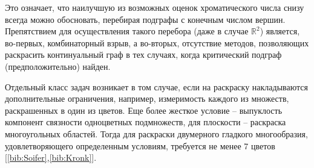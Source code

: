 Это означает, что наилучшую из возможных оценок хроматического числа снизу всегда можно обосновать, перебирая подграфы с конечным числом вершин. Препятствием для осуществления такого перебора (даже в случае $\mathbb{R}^2$) является, во-первых, комбинаторный взрыв, а во-вторых, отсутствие методов, позволяющих раскрасить континуальный граф в тех случаях, когда критический подграф (предположительно) найден.

Отдельный класс задач возникает в том случае, если на раскраску накладываются дополнительные ограничения, например, измеримость каждого из множеств, раскрашенных в один из цветов. Еще более жесткое условие -- выпуклость компонент связности одноцветных подмножеств, 
для плоскости -- раскраска многоугольных областей. Тогда для раскраски двумерного гладкого многообразия, удовлетворяющего определенным условиям, требуется не менее 7 цветов [\ref{bib:Soifer},\ref{bib:Kronk}].
